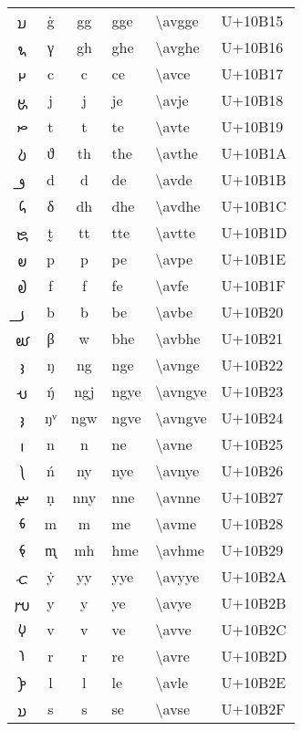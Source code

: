 \documentclass{article}
\begin{document}
{\begin{longtable}{ccclll}
{\avfont 𐬕 } &ġ &gg &gge &\textbackslash avgge &U+10B15 \\
{\avfont 𐬖 } &γ &gh &ghe &\textbackslash avghe &U+10B16 \\
{\avfont 𐬗 } &c &c &ce &\textbackslash avce &U+10B17 \\
{\avfont 𐬘 } &j &j &je &\textbackslash avje &U+10B18 \\
{\avfont 𐬙 } &t &t &te &\textbackslash avte &U+10B19 \\
{\avfont 𐬚 } &ϑ &th &the &\textbackslash avthe &U+10B1A \\
{\avfont 𐬛 } &d &d &de &\textbackslash avde &U+10B1B \\
{\avfont 𐬜 } &δ &dh &dhe &\textbackslash avdhe &U+10B1C \\
{\avfont 𐬝 } &t̰ &tt &tte &\textbackslash avtte &U+10B1D \\
{\avfont 𐬞 } &p &p &pe &\textbackslash avpe &U+10B1E \\
{\avfont 𐬟 } &f &f &fe &\textbackslash avfe &U+10B1F \\
{\avfont 𐬠 } &b &b &be &\textbackslash avbe &U+10B20 \\
{\avfont 𐬡 } &β &w &bhe &\textbackslash avbhe &U+10B21 \\
{\avfont 𐬢 } &ŋ &ng &nge &\textbackslash avnge &U+10B22 \\
{\avfont 𐬣 } &ŋ́ &ngj &ngye &\textbackslash avngye &U+10B23 \\
{\avfont 𐬤 } &ŋᵛ &ngw &ngve &\textbackslash avngve &U+10B24 \\
{\avfont 𐬥 } &n &n &ne &\textbackslash avne &U+10B25 \\
{\avfont 𐬦 } &ń &ny &nye &\textbackslash avnye &U+10B26 \\
{\avfont 𐬧 } &ṇ &nny &nne &\textbackslash avnne &U+10B27 \\
{\avfont 𐬨 } &m &m &me &\textbackslash avme &U+10B28 \\
{\avfont 𐬩 } &m̨ &mh &hme &\textbackslash avhme &U+10B29 \\
{\avfont 𐬪 } &ẏ &yy &yye &\textbackslash avyye &U+10B2A \\
{\avfont 𐬫 } &y &y &ye &\textbackslash avye &U+10B2B \\
{\avfont 𐬬 } &v &v &ve &\textbackslash avve &U+10B2C \\
{\avfont 𐬭 } &r &r &re &\textbackslash avre &U+10B2D \\
{\avfont 𐬮 } &l &l &le &\textbackslash avle &U+10B2E \\
{\avfont 𐬯 } &s &s &se &\textbackslash avse &U+10B2F \\

\end{longtable}}
\end{document}
